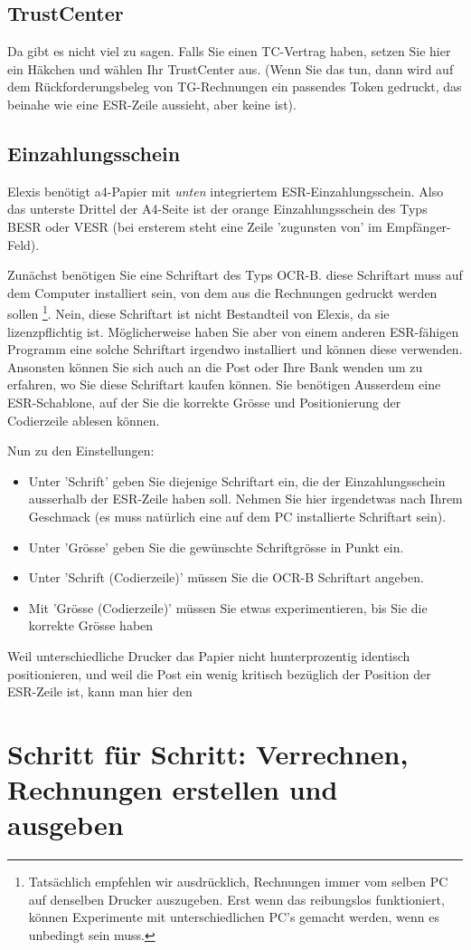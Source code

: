 \documentclass[a4paper]{scrartcl}
\begin{document}
\subsection{TrustCenter}
Da gibt es nicht viel zu sagen. Falls Sie einen TC-Vertrag haben, setzen Sie hier ein Häkchen und wählen Ihr TrustCenter aus. (Wenn Sie das tun, dann wird auf dem Rückforderungsbeleg von TG-Rechnungen ein passendes Token gedruckt, das beinahe wie eine ESR-Zeile aussieht, aber keine ist).

\subsection{Einzahlungsschein}
Elexis benötigt a4-Papier mit \textit{unten} integriertem ESR-Einzahlungsschein. Also das unterste Drittel der A4-Seite ist der orange Einzahlungsschein des Typs BESR oder VESR (bei ersterem steht eine Zeile 'zugunsten von' im Empfänger-Feld).

Zunächst benötigen Sie eine Schriftart des Typs OCR-B. diese Schriftart muss auf dem Computer installiert sein, von dem aus die Rechnungen gedruckt werden sollen \footnote{Tatsächlich empfehlen wir ausdrücklich, Rechnungen immer vom selben PC auf denselben Drucker auszugeben. Erst wenn das reibungslos funktioniert, können Experimente mit unterschiedlichen PC's gemacht werden, wenn es unbedingt sein muss.}. Nein, diese Schriftart ist nicht Bestandteil von Elexis, da sie lizenzpflichtig ist. Möglicherweise haben Sie aber von einem anderen ESR-fähigen Programm eine solche Schriftart irgendwo installiert und können diese verwenden. Ansonsten können Sie sich auch an die Post oder Ihre Bank wenden um zu erfahren, wo Sie diese Schriftart kaufen können. Sie benötigen Ausserdem eine ESR-Schablone, auf der Sie die korrekte Grösse und Positionierung der Codierzeile ablesen können.

\medskip

Nun zu den Einstellungen:
\begin{itemize}
\item Unter 'Schrift' geben Sie diejenige Schriftart ein, die der Einzahlungsschein ausserhalb der ESR-Zeile haben soll. Nehmen Sie hier irgendetwas nach Ihrem Geschmack (es muss natürlich eine auf dem PC installierte Schriftart sein).
\item Unter 'Grösse' geben Sie die gewünschte Schriftgrösse in Punkt ein.
\item Unter 'Schrift (Codierzeile)' müssen Sie die OCR-B Schriftart angeben.
\item Mit 'Grösse (Codierzeile)' müssen Sie etwas experimentieren, bis Sie die korrekte Grösse haben
\end{itemize}



Weil unterschiedliche Drucker das Papier nicht hunterprozentig identisch positionieren, und weil die Post ein wenig kritisch bezüglich der Position der ESR-Zeile ist, kann man hier den

\section{Schritt für Schritt: Verrechnen, Rechnungen erstellen und ausgeben}
\label{rechnungenerstellen}
\label{fall-erfordernisse}
\end{document}
